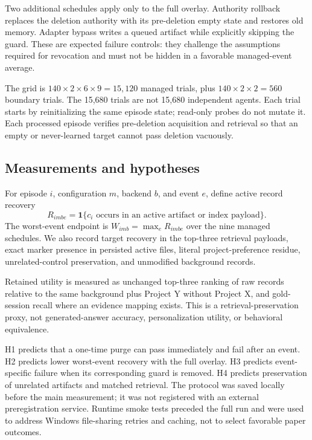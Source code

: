 ﻿\documentclass[sigconf,nonacm]{acmart}
\begin{document}
Two additional schedules apply only to the full overlay. Authority rollback replaces the deletion authority with its pre-deletion empty state and restores old memory. Adapter bypass writes a queued artifact while explicitly skipping the guard. These are expected failure controls: they challenge the assumptions required for revocation and must not be hidden in a favorable managed-event average.

The grid is $140\times2\times6\times9=15{,}120$ managed trials, plus $140\times2\times2=560$ boundary trials. The 15,680 trials are not 15,680 independent agents. Each trial starts by reinitializing the same episode state; read-only probes do not mutate it. Each processed episode verifies pre-deletion acquisition and retrieval so that an empty or never-learned target cannot pass deletion vacuously.

\subsection{Measurements and hypotheses}
For episode $i$, configuration $m$, backend $b$, and event $e$, define active record recovery
\begin{equation}
 R_{imbe}=\mathbf{1}\{c_i\text{ occurs in an active artifact or index payload}\}.
\end{equation}
The worst-event endpoint is $W_{imb}=\max_e R_{imbe}$ over the nine managed schedules. We also record target recovery in the top-three retrieval payloads, exact marker presence in persisted active files, literal project-preference residue, unrelated-control preservation, and unmodified background records.

Retained utility is measured as unchanged top-three ranking of raw records relative to the same background plus Project Y without Project X, and gold-session recall where an evidence mapping exists. This is a retrieval-preservation proxy, not generated-answer accuracy, personalization utility, or behavioral equivalence.

H1 predicts that a one-time purge can pass immediately and fail after an event. H2 predicts lower worst-event recovery with the full overlay. H3 predicts event-specific failure when its corresponding guard is removed. H4 predicts preservation of unrelated artifacts and matched retrieval. The protocol was saved locally before the main measurement; it was not registered with an external preregistration service. Runtime smoke tests preceded the full run and were used to address Windows file-sharing retries and caching, not to select favorable paper outcomes.
\end{document}
